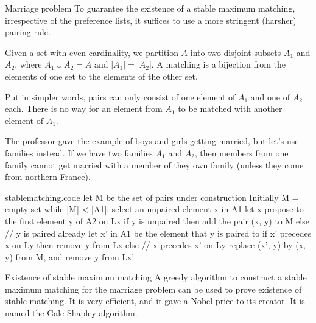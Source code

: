 \documentclass[a4paper]{article}
\begin{document}
\begin{parag}{Marriage problem}
    To guarantee the existence of a stable maximum matching, irrespective of the preference lists, it suffices to use a more stringent (harsher) pairing rule.

    Given a set with even cardinality, we partition $A$ into two disjoint subsets $A_1$ and $A_2$, where $A_1 \cup A_2 = A$ and $\left|A_1\right| = \left|A_2\right|$. A matching is a bijection from the elements of one set to the elements of the other set.

    Put in simpler words, pairs can only consist of one element of $A_1$ and one of $A_2$ each. There is no way for an element from $A_1$ to be matched with another element of $A_1$.

    The professor gave the example of boys and girls getting married, but let's use families instead. If we have two families $A_1$ and $A_2$, then members from one family cannot get married with a member of they own family (unless they come from northern France).
\end{parag}

\begin{filecontents*}[overwrite]{stablematching.code}
let M be the set of pairs under construction
Initially M = empty set
while |M| < |A1|:
    select an unpaired element x in A1
    let x propose to the first element y of A2 on Lx
    if y is unpaired then add the pair (x, y) to M
    else  // y is paired already
        let x' in A1 be the element that y is paired to
        if x' precedes x on Ly then remove y from Lx
        else  // x precedes x' on Ly
            replace (x', y) by (x, y) from M, and remove y from Lx'
\end{filecontents*}

\begin{parag}{Existence of stable maximum matching}
    A greedy algorithm to construct a stable maximum matching for the marriage problem can be used to prove existence of stable matching. It is very efficient, and it gave a Nobel price to its creator. It is named the Gale-Shapley algorithm.

\end{parag}
\end{document}
